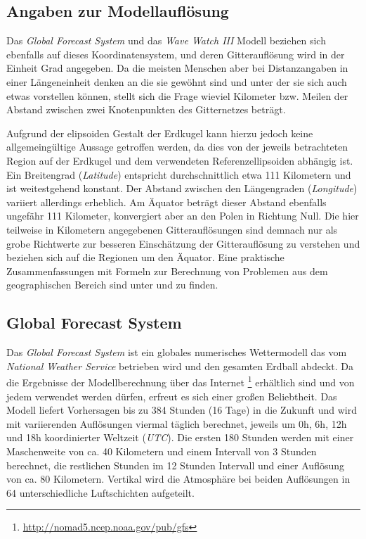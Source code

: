 \subsection{Angaben zur Modellauflösung}
Das \textit{Global Forecast System} und das \textit{Wave Watch III}
Modell beziehen sich ebenfalls auf dieses Koordinatensystem, und deren
Gitterauflösung wird in der Einheit Grad angegeben. Da die meisten
Menschen aber bei Distanzangaben in einer Längeneinheit denken an die
sie gewöhnt sind und unter der sie sich auch etwas vorstellen können,
stellt sich die Frage wieviel Kilometer bzw. Meilen der Abstand
zwischen zwei Knotenpunkten des Gitternetzes beträgt.

Aufgrund der elipsoiden Gestalt der Erdkugel kann hierzu jedoch keine
allgemeingültige Aussage getroffen werden, da dies von der jeweils
betrachteten Region auf der Erdkugel und dem verwendeten
Referenzellipsoiden abhängig ist. Ein Breitengrad (\textit{Latitude})
entspricht durchschnittlich etwa 111 Kilometern und ist weitestgehend
konstant. Der Abstand zwischen den Längengraden (\textit{Longitude})
variiert allerdings erheblich. Am Äquator beträgt dieser Abstand
ebenfalls ungefähr 111 Kilometer, konvergiert aber an den Polen in
Richtung Null. Die hier teilweise in Kilometern angegebenen
Gitterauflösungen sind demnach nur als grobe Richtwerte zur besseren
Einschätzung der Gitterauflösung zu verstehen und beziehen sich auf
die Regionen um den Äquator. Eine praktische Zusammenfassungen mit
Formeln zur Berechnung von Problemen aus dem geographischen Bereich
sind unter \cite{aviation} und \cite{movable_type_scripts} zu finden.

\subsection{Global Forecast System}

Das \textit{Global Forecast System} ist ein globales numerisches
Wettermodell das vom \textit{National Weather Service} betrieben wird
und den gesamten Erdball abdeckt. Da die Ergebnisse der
Modellberechnung über das Internet
\footnote{\url{http://nomad5.ncep.noaa.gov/pub/gfs}} erhältlich sind
und von jedem verwendet werden dürfen, erfreut es sich einer großen
Beliebtheit. Das Modell liefert Vorhersagen bis zu 384 Stunden (16
Tage) in die Zukunft und wird mit variierenden Auflösungen viermal
täglich berechnet, jeweils um 0h, 6h, 12h und 18h koordinierter
Weltzeit (\textit{UTC}). Die ersten 180 Stunden werden mit einer
Maschenweite von ca. 40 Kilometern und einem Intervall von 3 Stunden
berechnet, die restlichen Stunden im 12 Stunden Intervall und einer
Auflösung von ca. 80 Kilometern. Vertikal wird die Atmosphäre bei
beiden Auflösungen in 64 unterschiedliche Luftschichten aufgeteilt.

